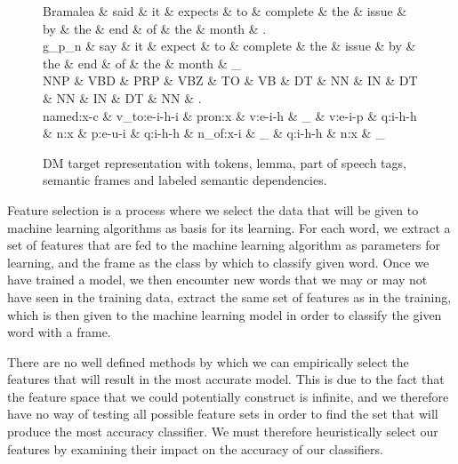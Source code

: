 \begin{figure}
    \centering
    \smaller[]
    \smaller[]
    \begin{dependency}[]
        \begin{deptext}[column sep=0.5em, row sep=.1ex]
            Bramalea \& said \& it \& expects \& to \& complete \& the \& issue \& by \& the \& end \& of \& the \& month \& . \\
            
            g\_p\_n \& say \& it \& expect \& to \& complete \& the \& issue \& by \& the \& end \& of \& the \& month \& \_ \\
            
            NNP \& VBD \& PRP \& VBZ \& TO \& VB \& DT \& NN \& IN \& DT \& NN \& IN \& DT \& NN \& . \\
            
            named:x-c \& v\_to:e-i-h-i \& pron:x \& v:e-i-h \& \_ \& v:e-i-p \& q:i-h-h \& n:x \& p:e-u-i \& q:i-h-h \& n\_of:x-i \& \_ \& q:i-h-h \& n:x \& \_ \\
        \end{deptext}
    \end{dependency}
    \caption{DM target representation with tokens, lemma, part of speech tags, semantic frames and labeled semantic dependencies.}
    \label{DM:all}
\end{figure}

Feature selection is a process where we select the data that will be given to machine learning algorithms as basis for its learning. For each word, we extract a set of features that are fed to the machine learning algorithm as parameters for learning, and the frame as the class by which to classify given word. Once we have trained a model, we then encounter new words that we may or may not have seen in the training data, extract the same set of features as in the training, which is then given to the machine learning model in order to classify the given word with a frame.

There are no well defined methods by which we can empirically select the features that will result in the most accurate model. This is due to the fact that the feature space that we could potentially construct is infinite, and we therefore have no way of testing all possible feature sets in order to find the set that will produce the most accuracy classifier. We must therefore heuristically select our features by examining their impact on the accuracy of our classifiers.

